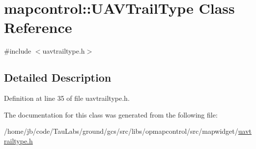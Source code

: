 \hypertarget{classmapcontrol_1_1_u_a_v_trail_type}{\section{mapcontrol\-:\-:\-U\-A\-V\-Trail\-Type \-Class \-Reference}
\label{classmapcontrol_1_1_u_a_v_trail_type}
}


{\ttfamily \#include $<$uavtrailtype.\-h$>$}



\subsection{\-Detailed \-Description}


\-Definition at line 35 of file uavtrailtype.\-h.



\-The documentation for this class was generated from the following file\-:\begin{DoxyCompactItemize}
\item 
/home/jb/code/\-Tau\-Labs/ground/gcs/src/libs/opmapcontrol/src/mapwidget/\hyperlink{uavtrailtype_8h}{uavtrailtype.\-h}\end{DoxyCompactItemize}
